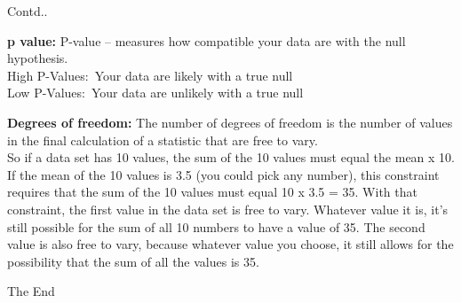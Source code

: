 \documentclass{beamer}
\begin{document}
\begin{frame}{Contd..}
\begin{flushleft}
	\textbf{p value:}
P-value – measures how compatible your data are with the null hypothesis.
\\
\vspace{10pt}
High P-Values: Your data are likely with a true null
\\
Low P-Values: Your data are unlikely with a true null
\\
\vspace{10pt}

\textbf{Degrees of freedom:}
	The number of degrees of freedom is the number of values in the final calculation of a statistic that are free to vary. 
\\
\vspace{10pt}
So if a data set has 10 values, the sum of the 10 values must equal the mean x 10. If the mean of the 10 values is 3.5 (you could pick any number), this constraint requires that the sum of the 10 values must equal 10 x 3.5 = 35. With that constraint, the first value in the data set is free to vary. Whatever value it is, it’s still possible for the sum of all 10 numbers to have a value of 35. The second value is also free to vary, because whatever value you choose, it still allows for the possibility that the sum of all the values is 35.
\end{flushleft}
\end{frame}

\begin{frame}
\huge{\centerline{The End}}
\end{frame}
\end{document}
